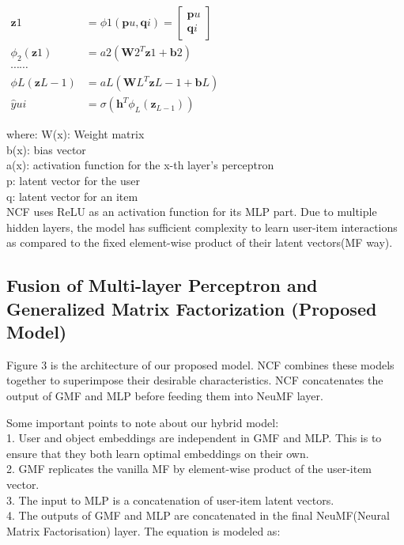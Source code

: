 \documentclass[sigconf]{acmart}
\begin{document}
$\begin{aligned} \mathbf{z}{1} &=\phi{1}\left(\mathbf{p}{u}, \mathbf{q}{i}\right)=\left[\begin{array}{c}\mathbf{p}{u} \\ \mathbf{q}{i}\end{array}\right] \\ \phi_{2}\left(\mathbf{z}{1}\right) &=a{2}\left(\mathbf{W}{2}^{T} \mathbf{z}{1}+\mathbf{b}{2}\right) \\ \cdots \cdots & \\ \phi{L}\left(\mathbf{z}{L-1}\right) &=a{L}\left(\mathbf{W}{L}^{T} \mathbf{z}{L-1}+\mathbf{b}{L}\right) \\ \hat{y}{u i} &=\sigma\left(\mathbf{h}^{T} \phi_{L}\left(\mathbf{z}_{L-1}\right)\right) \end{aligned}$

where:
W(x): Weight matrix\\
b(x): bias vector\\
a(x): activation function for the x-th layer’s perceptron\\
p: latent vector for the user\\
q: latent vector for an item\\
NCF uses ReLU as an activation function for its MLP part.
Due to multiple hidden layers, the model has sufficient complexity to learn user-item interactions as compared to the fixed element-wise product of their latent vectors(MF way).\\

\subsection{Fusion of Multi-layer Perceptron and Generalized Matrix Factorization (Proposed Model) }
Figure 3 is the architecture of our proposed model.
NCF combines these models together to superimpose their desirable characteristics. NCF concatenates the output of GMF and MLP before feeding them into NeuMF layer.

Some important points to note about our hybrid model:\\
1. User and object embeddings are independent in GMF and MLP. This is to ensure that they both learn optimal embeddings on their own. \\
2. GMF replicates the vanilla MF by element-wise product of the user-item vector.\\
3. The input to MLP is a concatenation of user-item latent vectors. \\
4. The outputs of GMF and MLP are concatenated in the final NeuMF(Neural Matrix Factorisation) layer.
The equation is modeled as:\\
\end{document}
